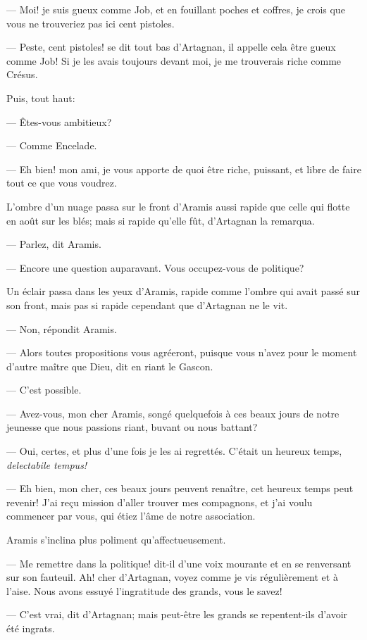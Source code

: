 — Moi! je suis gueux comme Job, et en fouillant poches et coffres, je crois que vous ne trouveriez pas ici cent pistoles.

— Peste, cent pistoles! se dit tout bas d'Artagnan, il appelle cela être gueux comme Job! Si je les avais toujours devant moi, je me trouverais riche comme Crésus.

Puis, tout haut:

— Êtes-vous ambitieux?

— Comme Encelade.

— Eh bien! mon ami, je vous apporte de quoi être riche, puissant, et libre de faire tout ce que vous voudrez.

L'ombre d'un nuage passa sur le front d'Aramis aussi rapide que celle qui flotte en août sur les blés; mais si rapide qu'elle fût, d'Artagnan la remarqua.

— Parlez, dit Aramis.

— Encore une question auparavant. Vous occupez-vous de politique?

Un éclair passa dans les yeux d'Aramis, rapide comme l'ombre qui avait passé sur son front, mais pas si rapide cependant que d'Artagnan ne le vit.

— Non, répondit Aramis.

— Alors toutes propositions vous agréeront, puisque vous n'avez pour le moment d'autre maître que Dieu, dit en riant le Gascon.

— C'est possible.

— Avez-vous, mon cher Aramis, songé quelquefois à ces beaux jours de notre jeunesse que nous passions riant, buvant ou nous battant?

— Oui, certes, et plus d'une fois je les ai regrettés. C'était un heureux temps, \textit{delectabile tempus!}

— Eh bien, mon cher, ces beaux jours peuvent renaître, cet heureux temps peut revenir! J'ai reçu mission d'aller trouver mes compagnons, et j'ai voulu commencer par vous, qui étiez l'âme de notre association.

Aramis s'inclina plus poliment qu'affectueusement.

— Me remettre dans la politique! dit-il d'une voix mourante et en se renversant sur son fauteuil. Ah! cher d'Artagnan, voyez comme je vis régulièrement et à l'aise. Nous avons essuyé l'ingratitude des grands, vous le savez!

— C'est vrai, dit d'Artagnan; mais peut-être les grands se repentent-ils d'avoir été ingrats.

